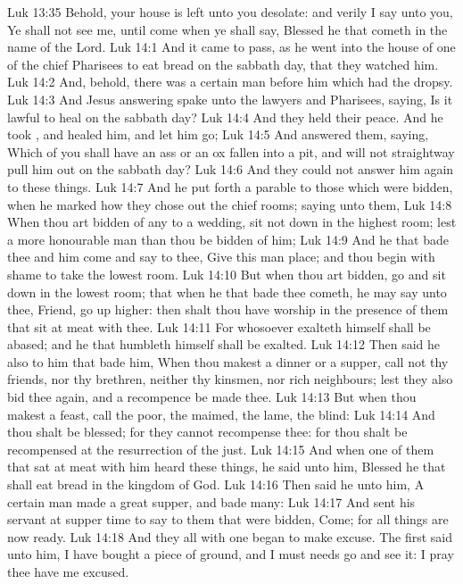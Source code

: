 \vs Luk 13:35 Behold, your house is left unto you desolate: and verily I say unto you, Ye shall not see me, until  come when ye shall say, Blessed  he that cometh in the name of the Lord.
\vs Luk 14:1 And it came to pass, as he went into the house of one of the chief Pharisees to eat bread on the sabbath day, that they watched him.
\vs Luk 14:2 And, behold, there was a certain man before him which had the dropsy.
\vs Luk 14:3 And Jesus answering spake unto the lawyers and Pharisees, saying, Is it lawful to heal on the sabbath day?
\vs Luk 14:4 And they held their peace. And he took , and healed him, and let him go;
\vs Luk 14:5 And answered them, saying, Which of you shall have an ass or an ox fallen into a pit, and will not straightway pull him out on the sabbath day?
\vs Luk 14:6 And they could not answer him again to these things.
\vs Luk 14:7 And he put forth a parable to those which were bidden, when he marked how they chose out the chief rooms; saying unto them,
\vs Luk 14:8 When thou art bidden of any  to a wedding, sit not down in the highest room; lest a more honourable man than thou be bidden of him;
\vs Luk 14:9 And he that bade thee and him come and say to thee, Give this man place; and thou begin with shame to take the lowest room.
\vs Luk 14:10 But when thou art bidden, go and sit down in the lowest room; that when he that bade thee cometh, he may say unto thee, Friend, go up higher: then shalt thou have worship in the presence of them that sit at meat with thee.
\vs Luk 14:11 For whosoever exalteth himself shall be abased; and he that humbleth himself shall be exalted.
\vs Luk 14:12 Then said he also to him that bade him, When thou makest a dinner or a supper, call not thy friends, nor thy brethren, neither thy kinsmen, nor  rich neighbours; lest they also bid thee again, and a recompence be made thee.
\vs Luk 14:13 But when thou makest a feast, call the poor, the maimed, the lame, the blind:
\vs Luk 14:14 And thou shalt be blessed; for they cannot recompense thee: for thou shalt be recompensed at the resurrection of the just.
\vs Luk 14:15 And when one of them that sat at meat with him heard these things, he said unto him, Blessed  he that shall eat bread in the kingdom of God.
\vs Luk 14:16 Then said he unto him, A certain man made a great supper, and bade many:
\vs Luk 14:17 And sent his servant at supper time to say to them that were bidden, Come; for all things are now ready.
\vs Luk 14:18 And they all with one  began to make excuse. The first said unto him, I have bought a piece of ground, and I must needs go and see it: I pray thee have me excused.
